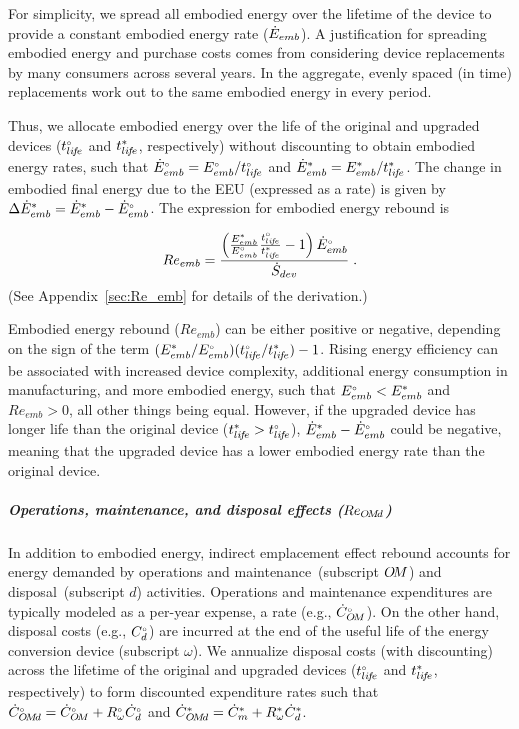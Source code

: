 \documentclass[12pt]{article}\usepackage[]{graphicx}\usepackage[]{xcolor}
\begin{document}
For simplicity, we spread all embodied energy
over the lifetime of the device
to provide a constant embodied energy rate ($\dot{E}_{emb}$).
A justification for spreading embodied energy and 
purchase costs comes from considering
device replacements by many consumers across several years.
In the aggregate, evenly spaced (in time) replacements
work out to the same embodied energy in every period.

Thus, we allocate embodied energy over the life of the original and upgraded devices
(${}{t}^{\scriptscriptstyle \circ}_{li\!f\!e}$ and ${t}^*_{li\!f\!e}$, respectively)
without discounting
to obtain embodied energy rates, such that
${}{\dot{E}}^{\scriptscriptstyle \circ}_{emb} = {}{E}^{\scriptscriptstyle \circ}_{emb} / {}{t}^{\scriptscriptstyle \circ}_{li\!f\!e}$
and 
${\dot{E}}^*_{emb} = {E}^*_{emb} / {t}^*_{li\!f\!e}$.
The change in embodied final energy due to the EEU (expressed as a rate) is given by
$\Delta {\dot{E}}^*_{emb} = {\dot{E}}^*_{emb} - {}{\dot{E}}^{\scriptscriptstyle \circ}_{emb}$.
The expression for embodied energy rebound is

\begin{equation} \label{eq:Re_emb}
  Re_{emb} = \frac{\left( \frac{{E}^*_{emb}}{{}{E}^{\scriptscriptstyle \circ}_{emb}} \frac{{}{t}^{\scriptscriptstyle \circ}_{li\!f\!e}}{{t}^*_{li\!f\!e}} - 1 \right) {}{\dot{E}}^{\scriptscriptstyle \circ}_{emb}}{\dot{S}_{dev}}{} \; .
\end{equation}
%
(See Appendix~\ref{sec:Re_emb} for details of the derivation.)

Embodied energy rebound ($Re_{emb}$)
can be either positive or negative, depending on 
the sign of the term
$({E}^*_{emb}/{}{E}^{\scriptscriptstyle \circ}_{emb})({}{t}^{\scriptscriptstyle \circ}_{li\!f\!e}/{t}^*_{li\!f\!e}) - 1$.
Rising energy efficiency can be associated with increased device complexity,
additional energy consumption in manufacturing, and
more embodied energy,
such that ${}{E}^{\scriptscriptstyle \circ}_{emb} < {E}^*_{emb}$ and $Re_{emb} > 0$,
all other things being equal.
However, if the upgraded device has longer life than the original device
(${t}^*_{li\!f\!e} > {}{t}^{\scriptscriptstyle \circ}_{li\!f\!e}$),
${\dot{E}}^*_{emb} - {}{\dot{E}}^{\scriptscriptstyle \circ}_{emb}$ could be negative,
meaning that the upgraded device has a lower embodied energy rate than the original device.


\subparagraph{Operations, maintenance, and disposal effects ($Re_{O\!M\!d}$)} 

In addition to embodied energy, 
indirect emplacement effect rebound accounts for
energy demanded by operations and maintenance~(subscript $O\!M$) and
disposal~(subscript $d$) activities.
Operations and maintenance expenditures 
are typically modeled as a per-year expense, a rate (e.g., ${}{\dot{C}}^{\scriptscriptstyle \circ}_{O\!M}$).
On the other hand, 
disposal costs (e.g., ${}{C}^{\scriptscriptstyle \circ}_d$) are incurred 
at the end of the useful life of the energy conversion device
(subscript $\omega$).
We annualize disposal costs (with discounting) across the lifetime 
of the original and upgraded devices
(${}{t}^{\scriptscriptstyle \circ}_{li\!f\!e}$ and ${t}^*_{li\!f\!e}$, respectively)
to form discounted expenditure rates such that 
${}{\dot{C}}^{\scriptscriptstyle \circ}_{O\!M\!d} = {}{\dot{C}}^{\scriptscriptstyle \circ}_{O\!M} 
                     + {}{R}^{\scriptscriptstyle \circ}_\omega {}{\dot{C}}^{\scriptscriptstyle \circ}_d$
and
${\dot{C}}^*_{O\!M\!d} = {\dot{C}}^*_m 
                     + {R}^*_\omega {\dot{C}}^*_d$.
\end{document}
